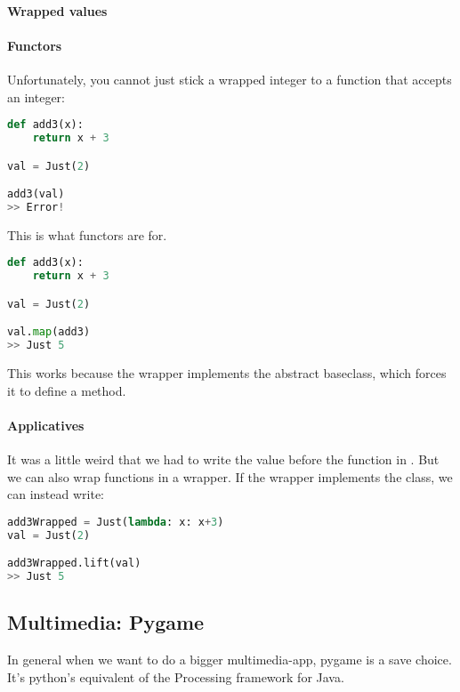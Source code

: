 \paragraph{Wrapped values}

\paragraph{Functors} Unfortunately, you cannot just stick a wrapped integer to a function that accepts an integer: 
\begin{lstlisting}[language=python]
def add3(x):
    return x + 3

val = Just(2)

add3(val) 
>> Error!
\end{lstlisting}

This is what functors are for. 
\begin{lstlisting}[language=python]
def add3(x):
    return x + 3

val = Just(2)

val.map(add3)
>> Just 5
\end{lstlisting}

This works because the  wrapper implements the abstract  baseclass, which forces it to define a  method. 


\paragraph{Applicatives} It was a little weird that we had to write the value before the function in . But we can also wrap functions in a wrapper. If the wrapper implements the  class, we can instead write:

\begin{lstlisting}[language=python]
add3Wrapped = Just(lambda: x: x+3)
val = Just(2)

add3Wrapped.lift(val)
>> Just 5
\end{lstlisting}


\subsection{Multimedia: Pygame}

In general when we want to do  a bigger multimedia-app, pygame is a save choice. It's python's equivalent of the Processing framework for Java. 

